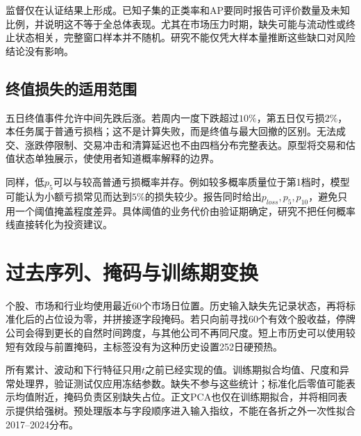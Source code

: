 
监督仅在认证结果上形成。已知子集的正类率和AP要同时报告可评价数量及未知比例，并说明这不等于全总体表现。尤其在市场压力时期，缺失可能与流动性或终止状态相关，完整窗口样本并不随机。研究不能仅凭大样本量推断这些缺口对风险结论没有影响。

\subsection{终值损失的适用范围}
五日终值事件允许中间先跌后涨。若周内一度下跌超过$10\%$，第五日仅亏损$2\%$，本任务属于普通亏损档；这不是计算失败，而是终值与最大回撤的区别。无法成交、涨跌停限制、交易冲击和清算延迟也不由四档分布完整表达。原型将交易和估值状态单独展示，使使用者知道概率解释的边界。

同样，低$p_5$可以与较高普通亏损概率并存。例如较多概率质量位于第1档时，模型可能认为小额亏损常见而达到$5\%$的损失较少。报告同时给出$p_{loss},p_5,p_{10}$，避免只用一个阈值掩盖程度差异。具体阈值的业务代价由验证期确定，研究不把任何概率线直接转化为投资建议。

\section{过去序列、掩码与训练期变换}
个股、市场和行业均使用最近60个市场日位置。历史输入缺失先记录状态，再将标准化后的占位设为零，并拼接逐字段掩码。若只向前寻找60个有效个股收益，停牌公司会得到更长的自然时间跨度，与其他公司不再同尺度。短上市历史可以使用较短有效段与前置掩码，主标签没有为这种历史设置252日硬预热。

所有累计、波动和下行特征只用$t$之前已经实现的值。训练期拟合均值、尺度和异常处理界，验证测试仅应用冻结参数。缺失不参与这些统计；标准化后零值可能表示均值附近，掩码负责区别缺失占位。正文PCA也仅在训练期拟合，并将相同表示提供给强树。预处理版本与字段顺序进入输入指纹，不能在各折之外一次性拟合2017--2024分布。

